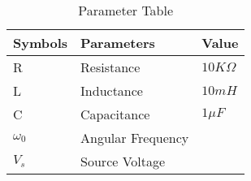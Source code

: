 \begin{table}[h]
\begin{tabular}{|l|l|l|}
\hline
\textbf{Symbols} & \textbf{Parameters} & \textbf{Value}\\ \hline
R & Resistance & $10K\Omega$ \\ \hline
L & Inductance & $10mH$ \\ \hline
C & Capacitance & $1\mu{F}$\\ \hline
$\omega_0$ & Angular Frequency & \\ \hline
$V_s$ & Source Voltage & \\ \hline
\end{tabular}
\caption{Parameter Table}
\label{tab:gate.bm.42}
\end{table}
